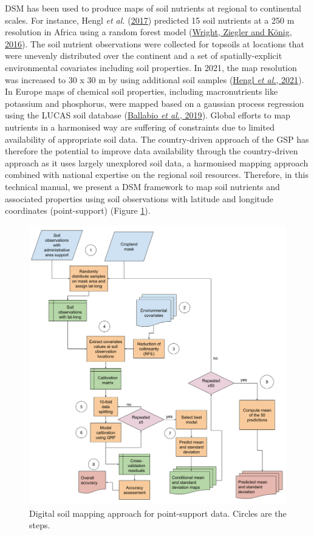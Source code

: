 \documentclass[
  10pt,
  b5paper,
  oneside]{book}
\begin{document}
DSM has been used to produce maps of soil nutrients at regional to continental scales. For instance, Hengl \emph{et al.} (\protect\hyperlink{ref-Hengl2017}{2017}) predicted 15 soil nutrients at a 250 m resolution in Africa using a random forest model (\protect\hyperlink{ref-wright2016}{Wright, Ziegler and König, 2016}). The soil nutrient observations were collected for topsoils at locations that were unevenly distributed over the continent and a set of spatially-explicit environmental covariates including soil properties. In 2021, the map resolution was increased to 30 x 30 m by using additional soil samples (\protect\hyperlink{ref-hengl2021}{Hengl \emph{et al.}, 2021}).
In Europe maps of chemical soil properties, including macronutrients like potassium and phosphorus, were mapped based on a gaussian process regression using the LUCAS soil database (\protect\hyperlink{ref-ballabio2019}{Ballabio \emph{et al.}, 2019}).
Global efforts to map nutrients in a harmonised way are suffering of constraints due to limited availability of appropriate soil data. The country-driven approach of the GSP has therefore the potential to improve data availability through the country-driven approach as it uses largely unexplored soil data, a harmonised mapping approach combined with national expertise on the regional soil resources. Therefore, in this technical manual, we present a DSM framework to map soil nutrients and associated properties using soil observations with latitude and longitude coordinates (point-support) (Figure \ref{fig:workflow1}).

\begin{figure}
\includegraphics[width=16.1in]{images/workflow_county_data} \caption{Digital soil mapping approach for point-support data. Circles are the steps.}\label{fig:workflow1}
\end{figure}
\end{document}

